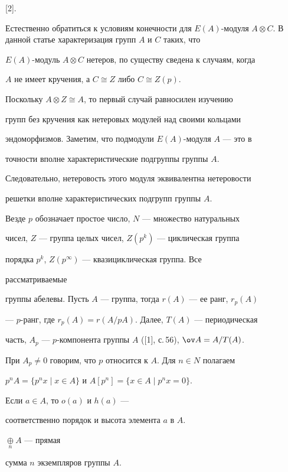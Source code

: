 [2]. 


 


Естественно обратиться к условиям конечности для $E(A)$-модуля $A\otimes 


C$. В данной статье характеризация групп $A$ и $C$ таких, что 


$E(A)$-модуль $A\otimes C$ нетеров, по существу сведена к случаям, когда 


$A$ не имеет кручения, а $C\cong Z$ либо $C\cong Z(p)$. 


 


Поскольку $A\otimes Z\cong A$, то первый случай равносилен изучению 


групп без кручения как нетеровых модулей над своими кольцами 


эндоморфизмов. Заметим, что подмодули $E(A)$-модуля $A$ --- это в 


точности вполне характеристические подгруппы группы $A$. 


Следовательно, нетеровость этого модуля эквивалентна нетеровости 


решетки вполне характеристических подгрупп группы $A$. 


 


Везде $p$ обозначает простое число, $N$ --- множество натуральных 


чисел, $Z$ --- группа целых чисел, $Z(p^k)$ --- циклическая группа 


порядка $p^k$, $Z(p^\infty)$ --- квазициклическая группа. Все 


рассматриваемые 


группы абелевы. Пусть $A$ --- группа, тогда $r(A)$ --- ее ранг, $r_p(A)$ 


--- $p$-ранг, где $r_p(A)=r(A/p A)$. Далее, $T(A)$ --- периодическая 


часть, $A_p$ --- $p$-компонента группы $A$ ([1], с.\,56), $\ov A=A/T(A)$. 


При $A_p\ne0$ говорим, что $p$ относится к $A$. Для $n\in N$ полагаем 


$p^n A=\{p^n x\mid x\in A\}$ и $A[p^n]=\{x\in A\mid p^n x=0\}$. 


Если $a\in A$, то $o(a)$ и $h(a)$ --- 


соответственно порядок и высота элемента $a$ в $A$.\; 


$\mathop{\oplus}\limits_{n}A$ --- прямая 


сумма $n$ экземпляров группы $A$. 


